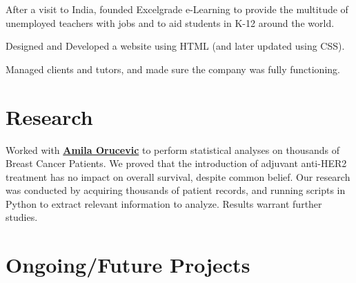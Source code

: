 \documentclass[letterpaper]{deedy-resume} %
\begin{document}
\begin{minipage}[t]{0.66\textwidth}
  \vspace{\topsep} %
  \begin{tightitemize}
  \item After a visit to India, founded Excelgrade e-Learning to provide the multitude of unemployed teachers with jobs and to aid students in K-12 around the world.
  \item Designed and Developed a website using HTML (and later updated using CSS).
  \item Managed clients and tutors, and made sure the company was fully functioning.
  \end{tightitemize}

  \sectionspace %


  \section{Research}


  Worked with \textbf{\href{http://gsm.utmck.edu/pathology/faculty/orucevic.cfm}{Amila Orucevic}} to perform statistical analyses on thousands of Breast Cancer Patients. We proved that the introduction of adjuvant anti-HER2 treatment has no impact on overall survival, despite common belief. Our research was conducted by acquiring thousands of patient records, and running scripts in Python to extract relevant information to analyze. Results warrant further studies.

  \sectionspace %


  \section{Ongoing/Future Projects}




\end{minipage}
\end{document}

